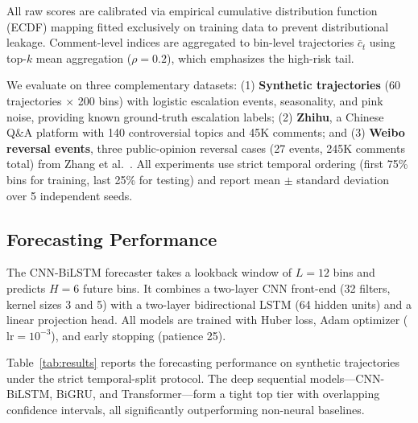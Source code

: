 \documentclass[11pt,a4paper]{article}
\begin{document}
All raw scores are calibrated via empirical cumulative distribution function (ECDF) mapping fitted exclusively on training data to prevent distributional leakage. Comment-level indices are aggregated to bin-level trajectories $\bar{c}_t$ using top-$k$ mean aggregation ($\rho=0.2$), which emphasizes the high-risk tail.

We evaluate on three complementary datasets: (1) \textbf{Synthetic trajectories} (60 trajectories $\times$ 200 bins) with logistic escalation events, seasonality, and pink noise, providing known ground-truth escalation labels; (2) \textbf{Zhihu}, a Chinese Q\&A platform with 140 controversial topics and 45K comments; and (3) \textbf{Weibo reversal events}, three public-opinion reversal cases (27 events, 245K comments total) from Zhang et al.~\cite{Zhang2023Reversal}. All experiments use strict temporal ordering (first 75\% bins for training, last 25\% for testing) and report mean $\pm$ standard deviation over 5 independent seeds.

\subsection{Forecasting Performance}

The CNN-BiLSTM forecaster takes a lookback window of $L{=}12$ bins and predicts $H{=}6$ future bins. It combines a two-layer CNN front-end (32 filters, kernel sizes 3 and 5) with a two-layer bidirectional LSTM (64 hidden units) and a linear projection head. All models are trained with Huber loss, Adam optimizer ($\text{lr}=10^{-3}$), and early stopping (patience 25).

Table~\ref{tab:results} reports the forecasting performance on synthetic trajectories under the strict temporal-split protocol. The deep sequential models---CNN-BiLSTM, BiGRU, and Transformer---form a tight top tier with overlapping confidence intervals, all significantly outperforming non-neural baselines.
\end{document}
